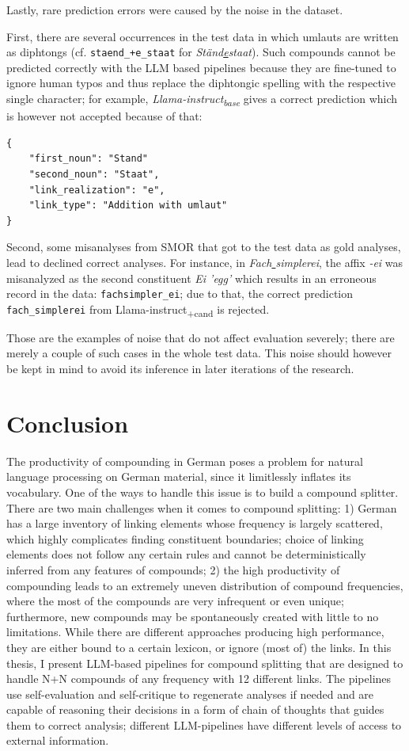 \documentclass[11pt]{article}
\begin{document}
Lastly, rare prediction errors were caused by the noise in the dataset.

First, there are several occurrences in the test data in which umlauts are written as diphtongs (cf. \texttt{staend\_+e\_staat} for \textit{St{\"a}nd\underline{e}staat}). Such compounds cannot be predicted correctly with the LLM based pipelines because they are fine-tuned to ignore human typos and thus replace the diphtongic spelling with the respective single character; for example, \textit{Llama-instruct\textsubscript{base}} gives a correct prediction which is however not accepted because of that:

\begin{verbatim}
{
    "first_noun": "Stand"
    "second_noun": "Staat",
    "link_realization": "e",
    "link_type": "Addition with umlaut"
}
\end{verbatim}

Second, some misanalyses from SMOR that got to the test data as gold analyses, lead to declined correct analyses. For instance, in \textit{Fach\underline{ }simplerei}, the affix \textit{-ei} was misanalyzed as the second constituent \textit{Ei 'egg'} which results in an erroneous record in the data: \texttt{fachsimpler\_ei}; due to that, the correct prediction \texttt{fach\_simplerei} from {Llama-instruct\textsubscript{+cand}} is rejected.

Those are the examples of noise that do not affect evaluation severely; there are merely a couple of such cases in the whole test data. This noise should however be kept in mind to avoid its inference in later iterations of the research.


\section{Conclusion}
\label{sec:conclusion}

The productivity of compounding in German poses a problem for natural language processing on German material, since it limitlessly inflates its vocabulary. One of the ways to handle this issue is to build a compound splitter. There are two main challenges when it comes to compound splitting: 1) German has a large inventory of linking elements whose frequency is largely scattered, which highly complicates finding constituent boundaries; choice of linking elements does not follow any certain rules and cannot be deterministically inferred from any features of compounds; 2) the high productivity of compounding leads to an extremely uneven distribution of compound frequencies, where the most of the compounds are very infrequent or even unique; furthermore, new compounds may be spontaneously created with little to no limitations. While there are different approaches producing high performance, they are either bound to a certain lexicon, or ignore (most of) the links. In this thesis, I present LLM-based pipelines for compound splitting that are designed to handle N+N compounds of any frequency with 12 different links. The pipelines use self-evaluation and self-critique to regenerate analyses if needed and are capable of reasoning their decisions in a form of chain of thoughts that guides them to correct analysis; different LLM-pipelines have different levels of access to external information. 
\end{document}
